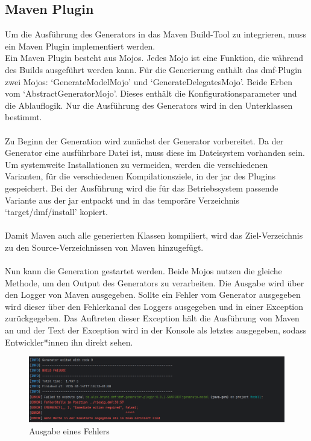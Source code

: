 \documentclass[./einleitung.tex]{subfiles}
\begin{document}
    \subsection{Maven Plugin}
    Um die Ausführung des Generators in das Maven Build-Tool zu integrieren, muss ein Maven Plugin implementiert werden.\\
    Ein Maven Plugin besteht aus Mojos.
    Jedes Mojo ist eine Funktion, die während des Builds ausgeführt werden kann.
    Für die Generierung enthält das \acrshort{dmf}-Plugin zwei Mojos: `GenerateModelMojo' und `GenerateDelegatesMojo'.
    Beide Erben vom `AbstractGeneratorMojo'.
    Dieses enthält die Konfigurationsparameter und die Ablauflogik.
    Nur die Ausführung des Generators wird in den Unterklassen bestimmt.
    \\\\
    Zu Beginn der Generation wird zunächst der Generator vorbereitet.
    Da der Generator eine ausführbare Datei ist, muss diese im Dateisystem vorhanden sein.
    Um systemweite Installationen zu vermeiden, werden die verschiedenen Varianten, für die verschiedenen Kompilationsziele, in der \acrshort{jar} des Plugins gespeichert.
    Bei der Ausführung wird die für das Betriebssystem passende Variante aus der \acrshort{jar} entpackt und in das temporäre Verzeichnis `target/dmf/install' kopiert.
    \\\\
    Damit Maven auch alle generierten Klassen kompiliert, wird das Ziel-Verzeichnis zu den Source-Verzeichnissen von Maven hinzugefügt.
    \\\\
    Nun kann die Generation gestartet werden.
    Beide Mojos nutzen die gleiche Methode, um den Output des Generators zu verarbeiten.
    Die Ausgabe wird über den Logger von Maven ausgegeben.
    Sollte ein Fehler vom Generator ausgegeben wird dieser über den Fehlerkanal des Loggers ausgegeben und in einer Exception zurückgegeben.
    Das Auftreten dieser Exception hält die Ausführung von Maven an und der Text der Exception wird in der Konsole als letztes ausgegeben, sodass Entwickler*innen ihn direkt sehen.
    \begin{figure}[tH]
        \centering
        \includegraphics[width=\linewidth]{bilder/screenshot-error-generator}
        \caption{Ausgabe eines Fehlers}
        \label{fig:screenshot-error-generator}
    \end{figure}
\end{document}
